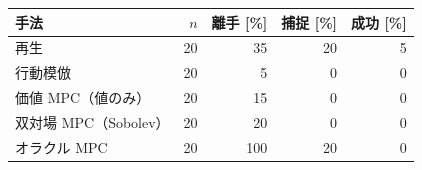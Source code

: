 \begin{tabular}{lrrrr}
\toprule
手法 & $n$ & 離手 [\%] & 捕捉 [\%] & 成功 [\%] \\
\midrule
再生 & 20 & 35 & 20 & 5 \\
行動模倣 & 20 & 5 & 0 & 0 \\
価値 MPC（値のみ） & 20 & 15 & 0 & 0 \\
双対場 MPC（Sobolev） & 20 & 20 & 0 & 0 \\
オラクル MPC & 20 & 100 & 20 & 0 \\
\bottomrule
\end{tabular}
